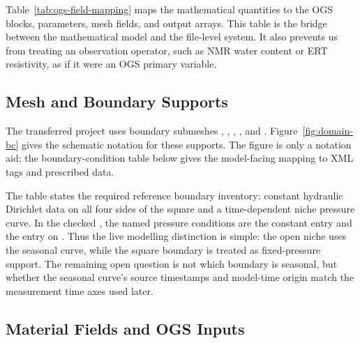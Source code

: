Table~\ref{tab:ogs-field-mapping} maps the mathematical quantities to the OGS
blocks, parameters, mesh fields, and output arrays.  This table is the bridge between
the mathematical model and the file-level system.  It also prevents us from treating
an observation operator, such as NMR water content or ERT resistivity, as if it were
an OGS primary variable.



\subsection{Mesh and Boundary Supports}
\label{sec:mesh-boundary-supports}

The transferred project uses boundary submeshes ,
, , , and .
Figure~\ref{fig:domain-bc} gives the schematic notation for these supports.  The
figure is only a notation aid; the boundary-condition table below gives the
model-facing mapping to XML tags and prescribed data.

\begin{center}
  \centering
  
  \label{fig:domain-bc}
\end{center}



The table states the required reference boundary inventory: constant hydraulic
Dirichlet data on all four sides of the square and a time-dependent niche pressure
curve.  In the checked , the named pressure
conditions are the constant  entry and the
 entry on .  Thus the live modelling
distinction is simple: the open niche uses the seasonal curve, while the square
boundary is treated as fixed-pressure support.  The remaining open question is not
which boundary is seasonal, but whether the seasonal curve's source timestamps and
model-time origin match the measurement time axes used later.

\subsection{Material Fields and OGS Inputs}
\label{sec:material-fields-ogs-inputs}


